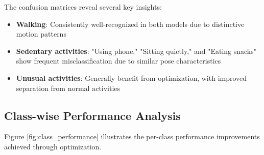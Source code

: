 \documentclass[a4paper,11pt]{article}
\begin{document}
The confusion matrices reveal several key insights:
\begin{itemize}
\item \textbf{Walking}: Consistently well-recognized in both models due to distinctive motion patterns
\item \textbf{Sedentary activities}: "Using phone," "Sitting quietly," and "Eating snacks" show frequent misclassification due to similar pose characteristics
\item \textbf{Unusual activities}: Generally benefit from optimization, with improved separation from normal activities
\end{itemize}

\subsection{Class-wise Performance Analysis}

Figure \ref{fig:class_performance} illustrates the per-class performance improvements achieved through optimization.
\end{document}
